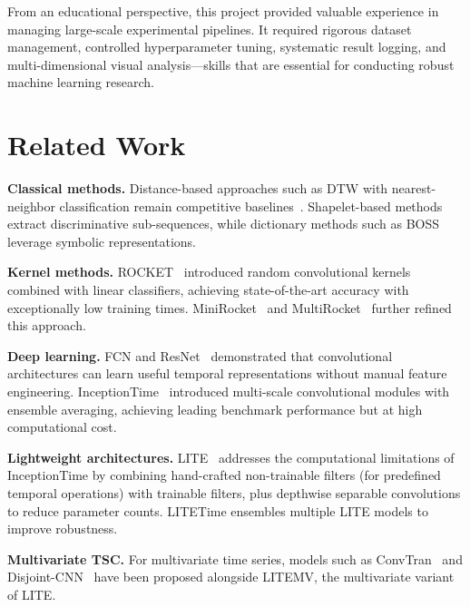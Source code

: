 \documentclass[conference]{IEEEtran}
\begin{document}
From an educational perspective, this project provided valuable experience in managing large-scale experimental pipelines. It required rigorous dataset management, controlled hyperparameter tuning, systematic result logging, and multi-dimensional visual analysis---skills that are essential for conducting robust machine learning research.

\section{Related Work}

\textbf{Classical methods.} Distance-based approaches such as DTW with nearest-neighbor classification remain competitive baselines~\cite{bagnall2017bakeoff}. Shapelet-based methods~\cite{lines2012shapelet} extract discriminative sub-sequences, while dictionary methods such as BOSS leverage symbolic representations.

\textbf{Kernel methods.} ROCKET~\cite{dempster2020rocket} introduced random convolutional kernels combined with linear classifiers, achieving state-of-the-art accuracy with exceptionally low training times. MiniRocket~\cite{dempster2021minirocket} and MultiRocket~\cite{tan2022multirocket} further refined this approach.

\textbf{Deep learning.} FCN and ResNet~\cite{wang2017fcn} demonstrated that convolutional architectures can learn useful temporal representations without manual feature engineering. InceptionTime~\cite{fawaz2020inceptiontime} introduced multi-scale convolutional modules with ensemble averaging, achieving leading benchmark performance but at high computational cost.

\textbf{Lightweight architectures.} LITE~\cite{ismail2024lite} addresses the computational limitations of InceptionTime by combining hand-crafted non-trainable filters (for predefined temporal operations) with trainable filters, plus depthwise separable convolutions to reduce parameter counts. LITETime ensembles multiple LITE models to improve robustness.

\textbf{Multivariate TSC.} For multivariate time series, models such as ConvTran~\cite{foumani2023convtran} and Disjoint-CNN~\cite{zhao2017cnn_tsc} have been proposed alongside LITEMV, the multivariate variant of LITE.

\end{document}
